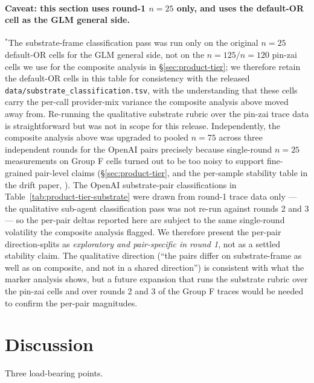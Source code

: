 \documentclass[11pt,a4paper]{article}
\begin{document}
\paragraph{Caveat: this section uses round-1 $n{=}25$ only, and uses the default-OR cell as the GLM general side.} $^*$The substrate-frame classification pass was run only on the original $n{=}25$ default-OR cells for the GLM general side, not on the $n{=}125 / n{=}120$ pin-zai cells we use for the composite analysis in \S\ref{sec:product-tier}; we therefore retain the default-OR cells in this table for consistency with the released \texttt{data/substrate\_classification.tsv}, with the understanding that these cells carry the per-call provider-mix variance the composite analysis above moved away from. Re-running the qualitative substrate rubric over the pin-zai trace data is straightforward but was not in scope for this release. Independently, the composite analysis above was upgraded to pooled $n{=}75$ across three independent rounds for the OpenAI pairs precisely because single-round $n{=}25$ measurements on Group F cells turned out to be too noisy to support fine-grained pair-level claims (\S\ref{sec:product-tier}, and the per-sample stability table in the drift paper, \citep{tenner2026drift}). The OpenAI substrate-pair classifications in Table~\ref{tab:product-tier-substrate} were drawn from round-1 trace data only --- the qualitative sub-agent classification pass was not re-run against rounds 2 and 3 --- so the per-pair deltas reported here are subject to the same single-round volatility the composite analysis flagged. We therefore present the per-pair direction-splits as \emph{exploratory and pair-specific in round 1}, not as a settled stability claim. The qualitative direction (``the pairs differ on substrate-frame as well as on composite, and not in a shared direction'') is consistent with what the marker analysis shows, but a future expansion that runs the substrate rubric over the pin-zai cells and over rounds 2 and 3 of the Group F traces would be needed to confirm the per-pair magnitudes.

\section{Discussion}
\label{sec:discussion}

Three load-bearing points.
\end{document}
